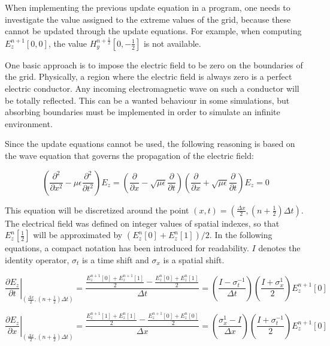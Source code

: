 When implementing the previous update equation in a program, one needs to investigate the value assigned to the extreme values of the grid, because these cannot be updated through the update equations. For example, when computing $E_z^{n+1} \left[ 0,0 \right]$, the value $H_y^{n+\frac{1}{2}} \left[ 0 , - \frac{1}{2} \right ]$ is not available.

One basic approach is to impose the electric field to be zero on the boundaries of the grid. Physically, a region where the electric field is always zero is a perfect electric conductor. Any incoming electromagnetic wave on such a conductor will be totally reflected. This can be a wanted behaviour in some simulations, but absorbing boundaries must be implemented in order to simulate an infinite environment. 

Since the update equations cannot be used, the following reasoning is based on the wave equation that governs the propagation of the electric field:

\begin{equation}
    \left( \frac{\partial^2}{\partial x^2} - \mu \epsilon \frac{\partial ^2}{\partial t^2} \right) E_z =  \left( \frac{\partial}{\partial x} - \sqrt{\mu \epsilon} \frac{\partial}{\partial t} \right) \left( \frac{\partial}{\partial x} + \sqrt{\mu \epsilon} \frac{\partial}{\partial t} \right)E_z = 0
\end{equation}

This equation will be discretized around the point $(x,t) = \left(\frac{\Delta x}{2}, (n+\frac{1}{2}) \Delta t\right)$. The electrical field was defined on integer values of spatial indexes, so that $E_z^n\left[\frac{1}{2}\right]$ will be approximated by $(E_z^n\left[0\right] + E_z^n\left[1\right])/2$. In the following equations, a compact notation has been introduced for readability. $I$ denotes the identity operator, $\sigma_t$ is a time shift and $\sigma_x$ is a spatial shift.

\begin{equation}
	\left.\frac{\partial E_z}{\partial t}\right|_{\left(\frac{\Delta x}{2}, (n+\frac{1}{2}) \Delta t\right)} = \frac{\frac{E_z^{n+1} \left[0\right] + E_z^{n+1} \left[1\right]}{2} - \frac{E_z^{n} \left[0\right] + E_z^{n} \left[1\right]}{2}}{\Delta t} =  \left( \frac{I - \sigma_t^{-1}}{\Delta t} \right) \left( \frac{I + \sigma_x^{1}}{2}\right) E_z^{n+1} \left[0\right]	
\end{equation}

\begin{equation}
\left.\frac{\partial E_z}{\partial x}\right|_{\left(\frac{\Delta x}{2}, (n+\frac{1}{2}) \Delta t\right)} = \frac{\frac{E_z^{n+1} \left[1\right] + E_z^{n} \left[1\right]}{2} - \frac{E_z^{n+1} \left[0\right] + E_z^{n} \left[0\right]}{2}}{\Delta x} =  \left( \frac{\sigma_x^{1} - I}{\Delta x} \right) \left( \frac{I + \sigma_t^{-1}}{2}\right) E_z^{n+1} \left[0\right]	
\end{equation}

